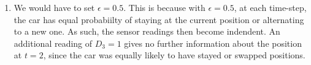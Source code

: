 \documentclass[12pt]{article}
\begin{document}
\begin{enumerate}[label=(\alph*)]
\begin{enumerate}[label=(\roman*)]
    \item We would have to set $\epsilon = 0.5$. This is because with $\epsilon = 0.5$, at each time-step, the car has equal probabiilty of staying at the current position or alternating to a new one. As such, the sensor readings then become indendent. An additional reading of $D_3 = 1$ gives no further information about the position at $t = 2$, since the car was equally likely to have stayed or swapped positions.
  \end{enumerate}
\end{enumerate}
\end{document}
